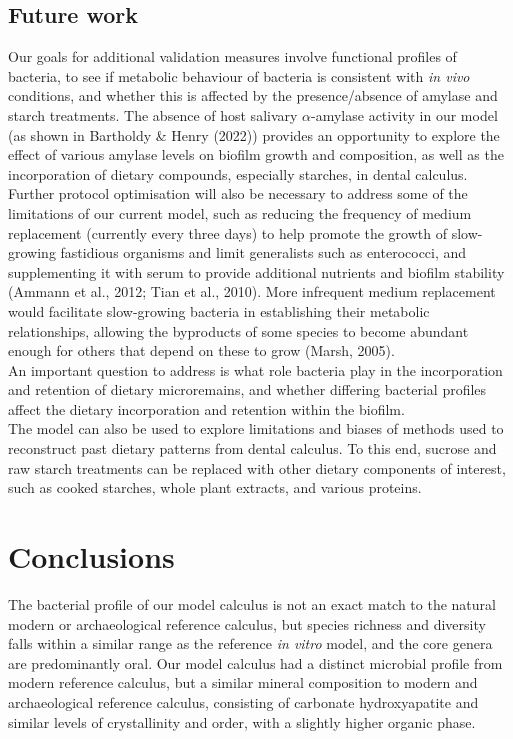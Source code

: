 \documentclass[
]{article}
\begin{document}
\hypertarget{future-work}{%
\subsection{Future work}\label{future-work}}

Our goals for additional validation measures involve functional profiles
of bacteria, to see if metabolic behaviour of bacteria is consistent
with \emph{in vivo} conditions, and whether this is affected by the
presence/absence of amylase and starch treatments. The absence of host
salivary \(\alpha\)-amylase activity in our model (as shown in Bartholdy
\& Henry (2022)) provides an opportunity to explore the effect of
various amylase levels on biofilm growth and composition, as well as the
incorporation of dietary compounds, especially starches, in dental
calculus. Further protocol optimisation will also be necessary to
address some of the limitations of our current model, such as reducing
the frequency of medium replacement (currently every three days) to help
promote the growth of slow-growing fastidious organisms and limit
generalists such as enterococci, and supplementing it with serum to
provide additional nutrients and biofilm stability (Ammann et al., 2012;
Tian et al., 2010). More infrequent medium replacement would facilitate
slow-growing bacteria in establishing their metabolic relationships,
allowing the byproducts of some species to become abundant enough for
others that depend on these to grow (Marsh, 2005).\\
An important question to address is what role bacteria play in the
incorporation and retention of dietary microremains, and whether
differing bacterial profiles affect the dietary incorporation and
retention within the biofilm.\\
The model can also be used to explore limitations and biases of methods
used to reconstruct past dietary patterns from dental calculus. To this
end, sucrose and raw starch treatments can be replaced with other
dietary components of interest, such as cooked starches, whole plant
extracts, and various proteins.

\hypertarget{conclusions}{%
\section{Conclusions}\label{conclusions}}

The bacterial profile of our model calculus is not an exact match to the
natural modern or archaeological reference calculus, but species
richness and diversity falls within a similar range as the reference
\emph{in vitro} model, and the core genera are predominantly oral. Our
model calculus had a distinct microbial profile from modern reference
calculus, but a similar mineral composition to modern and archaeological
reference calculus, consisting of carbonate hydroxyapatite and similar
levels of crystallinity and order, with a slightly higher organic phase.
\end{document}
